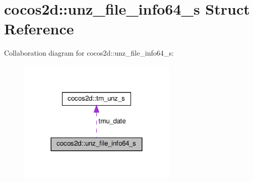 \hypertarget{structcocos2d_1_1unz__file__info64__s}{}\section{cocos2d\+:\+:unz\+\_\+file\+\_\+info64\+\_\+s Struct Reference}
\label{structcocos2d_1_1unz__file__info64__s}


Collaboration diagram for cocos2d\+:\+:unz\+\_\+file\+\_\+info64\+\_\+s\+:
\nopagebreak
\begin{figure}[H]
\begin{center}
\leavevmode
\includegraphics[width=215pt]{structcocos2d_1_1unz__file__info64__s__coll__graph}
\end{center}
\end{figure}
